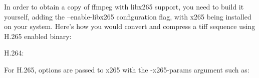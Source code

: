 \begin{fullwidth}
In order to obtain a copy of ffmpeg with libx265 support, you need to build it yourself, adding the --enable-libx265 configuration flag, with x265 being installed on your system. Here’s how you would convert and compress a tiff sequence using H.265 enabled binary:

H.264:


For H.265, options are passed to x265 with the -x265-params argument such as:



\clearpage
\end{fullwidth}
